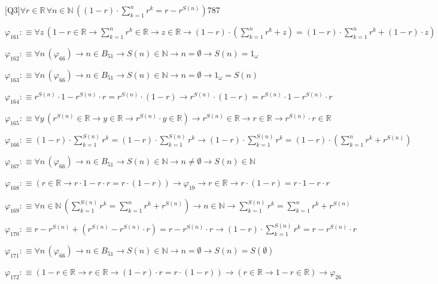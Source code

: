 \begin{fullproof}{[Q3]}{$\forall r \in \mathbb{R}\,\forall n \in \mathbb{N}\,((1 - r) \cdot {\textstyle\sum_{k=1}^{n} {{r}^{k}}} = r - {{r}^{S(n)}})$}{787}
\begin{abbrevlist}
\item $\varphi_{161} :\equiv \forall z\,(1 - r \in \mathbb{R} \to {\textstyle\sum_{k=1}^{n} {{r}^{k}}} \in \mathbb{R} \to z \in \mathbb{R} \to (1 - r) \cdot ({\textstyle\sum_{k=1}^{n} {{r}^{k}}} + z) = (1 - r) \cdot {\textstyle\sum_{k=1}^{n} {{r}^{k}}} + (1 - r) \cdot z)$
\item $\varphi_{162} :\equiv \forall n\,(\varphi_{66}) \to n \in B_{51} \to S(n) \in \mathbb{N} \to n = \emptyset \to S(n) = 1_{\omega}$
\item $\varphi_{163} :\equiv \forall n\,(\varphi_{66}) \to n \in B_{51} \to S(n) \in \mathbb{N} \to n = \emptyset \to 1_{\omega} = S(n)$
\item $\varphi_{164} :\equiv {{r}^{S(n)}} \cdot 1 - {{r}^{S(n)}} \cdot r = {{r}^{S(n)}} \cdot (1 - r) \to {{r}^{S(n)}} \cdot (1 - r) = {{r}^{S(n)}} \cdot 1 - {{r}^{S(n)}} \cdot r$
\item $\varphi_{165} :\equiv \forall y\,({{r}^{S(n)}} \in \mathbb{R} \to y \in \mathbb{R} \to {{r}^{S(n)}} \cdot y \in \mathbb{R}) \to {{r}^{S(n)}} \in \mathbb{R} \to r \in \mathbb{R} \to {{r}^{S(n)}} \cdot r \in \mathbb{R}$
\item $\varphi_{166} :\equiv (1 - r) \cdot {\textstyle\sum_{k=1}^{S(n)} {{r}^{k}}} = (1 - r) \cdot {\textstyle\sum_{k=1}^{S(n)} {{r}^{k}}} \to (1 - r) \cdot {\textstyle\sum_{k=1}^{S(n)} {{r}^{k}}} = (1 - r) \cdot ({\textstyle\sum_{k=1}^{n} {{r}^{k}}} + {{r}^{S(n)}})$
\item $\varphi_{167} :\equiv \forall n\,(\varphi_{66}) \to n \in B_{51} \to S(n) \in \mathbb{N} \to n \neq \emptyset \to S(n) \in \mathbb{N}$
\item $\varphi_{168} :\equiv (r \in \mathbb{R} \to r \cdot 1 - r \cdot r = r \cdot (1 - r)) \to \varphi_{19} \to r \in \mathbb{R} \to r \cdot (1 - r) = r \cdot 1 - r \cdot r$
\item $\varphi_{169} :\equiv \forall n \in \mathbb{N}\,({\textstyle\sum_{k=1}^{S(n)} {{r}^{k}}} = {\textstyle\sum_{k=1}^{n} {{r}^{k}}} + {{r}^{S(n)}}) \to n \in \mathbb{N} \to {\textstyle\sum_{k=1}^{S(n)} {{r}^{k}}} = {\textstyle\sum_{k=1}^{n} {{r}^{k}}} + {{r}^{S(n)}}$
\item $\varphi_{170} :\equiv r - {{r}^{S(n)}} + ({{r}^{S(n)}} - {{r}^{S(n)}} \cdot r) = r - {{r}^{S(n)}} \cdot r \to (1 - r) \cdot {\textstyle\sum_{k=1}^{S(n)} {{r}^{k}}} = r - {{r}^{S(n)}} \cdot r$
\item $\varphi_{171} :\equiv \forall n\,(\varphi_{66}) \to n \in B_{51} \to S(n) \in \mathbb{N} \to n = \emptyset \to S(n) = S(\emptyset)$
\item $\varphi_{172} :\equiv (1 - r \in \mathbb{R} \to r \in \mathbb{R} \to (1 - r) \cdot r = r \cdot (1 - r)) \to (r \in \mathbb{R} \to 1 - r \in \mathbb{R}) \to \varphi_{26}$

\end{abbrevlist}
\end{fullproof}
